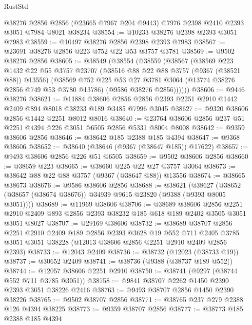\begin{lexlean}{RustStd}
\begin{coremodule}
    @38276
    @2856
    @2856
    (@23665 @7967 @204 @9443)
    @7976
    @2398
    @2410
    @2393
    @3051
    @7984
    @8021
    @38234
@38554 := @10233 @38276 @2398 @2393 @3051 @7983
@38559 := @10497 @38276 @2856 @2398 @2393 @7983
@38567 := @23691 @38276 @2856 @223 @752 @22 @53 @3757 @3781
@38569 := @9502 @38276 @2856
@38605 := @38549
    (@38554
      (@38559
        (@38567
          (@38569
            @223
            @1432
            @22
            @55
            @3757
            @23707
            (@38516 @88 @22 @88 @3757 (@9367 (@38521 @88)) @13556)
            (@38569
              @752
              @225
              @53
              @27
              @3781
              @3064
              (@13774 @38276 @2856 @749 @53 @3780 @13786)
              (@9586 @38276 @2856))))))
@38606 := @9446 @38276
@38621 := @11884
    @38606
    @2856
    @2856
    @2393
    @2251
    @2910
    @1442
    @2409
    @894
    @8018
    @38233
    @189
    @3485
    @7996
    @3045
@38627 := @9320 @38606 @2856 @1442 @2251 @8012 @8016
@38640 := @23764 @38606 @2856 @237 @51 @2251 @4394 @226 @3051 @6505 @2856 @5331 @8004 @8008
@38642 := @9359 @38606 @2856
@38646 := @38642 @185 @2388 @185 @4394
@38647 := @9368 @38606
@38652 := @38640 (@38646 (@9367 (@38647 @185)) @17622)
@38657 := @9493 @38606 @2856 @226 @51 @6505
@38659 := @9502 @38606 @2856
@38660 := @38659 @223
@38665 := @38660 @225 @22 @27 @3757 @3064
@38673 := @38642 @88 @22 @88 @3757 (@9367 (@38647 @88)) @13556
@38674 := @38665 @38673
@38676 := @9586 @38606 @2856
@38688 := @38621
    (@38627 (@38652 (@38657 (@38674 @38676)) @34939 @9615 @23820 (@9388 (@9393 @8005 @3051))))
@38689 := @11969 @38606
@38706 := @38689
    @38606
    @2856
    @2251
    @2910
    @2409
    @893
    @2856
    @2393
    @38232
    @185
    @618
    @189
    @2402
    @3505
    @3051
    @3051
    @8027
@38707 := @29169 @38606
@38732 := @38689
    @38707
    @2856
    @2251
    @2910
    @2409
    @189
    @2856
    @2393
    @3628
    @19
    @552
    @711
    @2405
    @3785
    @3051
    @3051
    @38228
    (@12013 @38606 @2856 @2251 @2910 @2409 @2856 @2393)
@38733 := @12043 @2409
@38736 := @38732 (@12023 (@38733 @19))
@38737 := @30652 @2409
@38741 := @38736 (@9388 (@38737 @189 @552))
@38744 := @12057 @38606 @2251 @2910
@38750 := @38741 (@9297 (@38744 @552 @711 @3785 @3051))
@38758 := @9841 @38707 @2262 @1450 @2390 @2393 @3051 @38226 @2416
@38763 := @9493 @38707 @2856 @1450 @2390 @38226
@38765 := @9502 @38707 @2856
@38771 := @38765 @237 @279 @2388 @126 @4394 @38225
@38773 := @9359 @38707 @2856
@38777 := @38773 @185 @2388 @185 @4394

\end{coremodule}
\end{lexlean}
